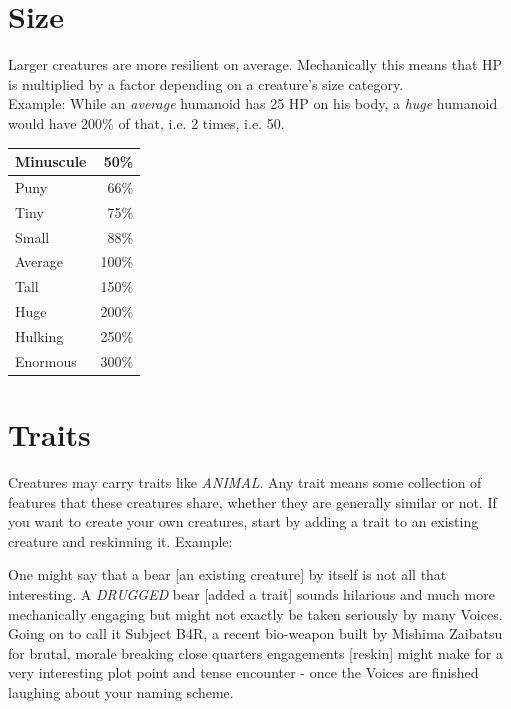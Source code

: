 \documentclass[12pt,a4paper,openany,usenames,dvipsnames]{book}
\begin{document}
	\section{Size}
	Larger creatures are more resilient on average. Mechanically this means that HP is multiplied by a factor depending on a creature's size category.\\
	Example: While an \emph{average} humanoid has 25 HP on his body, a \emph{huge} humanoid would have 200\% of that, i.e. 2 times, i.e. 50.\\
	\begin{center}
	\begin{tabular}{|l|r|}
		\hline
		Minuscule &  50\% \\ \hline
		Puny      &  66\% \\ \hline
		Tiny      &  75\% \\ \hline
		Small     &  88\% \\ \hline
		Average   & 100\% \\ \hline
		Tall      & 150\% \\ \hline
		Huge      & 200\% \\ \hline
		Hulking   & 250\% \\ \hline
		Enormous  & 300\% \\ \hline
	\end{tabular}
	\end{center}

	\section{Traits}
	Creatures may carry traits like \emph{ANIMAL}.
	Any trait means some collection of features that these creatures share,
		whether they are generally similar or not.
	If you want to create your own creatures,
		start by adding a trait to an existing creature and reskinning it.
	Example:\par
	\begin{exampleblock}
		One might say that a bear [an existing creature] by itself is not all that interesting.
		A \emph{DRUGGED} bear [added a trait] sounds hilarious
			and much more mechanically engaging
			but might not exactly be taken seriously by many Voices.
		\\%
		Going on to call it Subject B4R,
			a recent bio-weapon built by Mishima Zaibatsu
			for brutal, morale breaking close quarters engagements [reskin]
			might make for a very interesting plot point and tense encounter
			- once the Voices are finished laughing about your naming scheme.
	\end{exampleblock}
	
\end{document}
